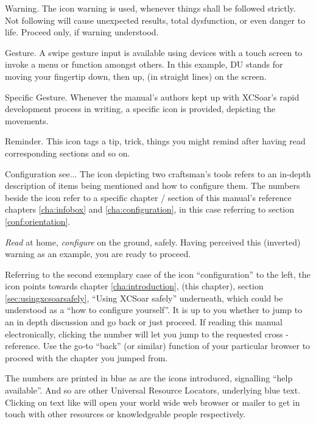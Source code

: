\warning Warning. The icon warning is used, whenever things shall be followed 
strictly.  Not following will cause unexpected results, total dysfunction, or
even danger to life. Proceed only, if warning understood.

 Gesture. A swipe gesture input is available using devices with a 
touch screen to invoke a menu or function amongst others. In this example, DU 
stands for moving your fingertip down, then up, (in straight lines) on the 
screen.
  
 Specific Gesture. Whenever the manual's authors kept up with XCSoar's rapid development process
in writing, a specific icon is provided, depicting the movements.

\tip Reminder. This icon tags a tip, trick, things you might remind after having read corresponding sections and so on.

 Configuration see... The icon depicting two craftsman's
tools refers to an in-depth description of items being mentioned and how to 
configure them. The numbers beside the icon refer to a specific chapter / 
section of this manual's reference chapters \ref{cha:infobox} and 
\ref{cha:configuration}, in this case referring to section 
\ref{conf:orientation}. 


\emph{Read} at home, \emph{configure} on the ground, safely. Having perceived 
this (inverted) warning as an example, you are ready to proceed.

 Referring to the second exemplary case of the icon 
``configuration'' to the left, the icon points
towards chapter \ref{cha:introduction}, (this chapter), section 
\ref{sec:usingxcsoarsafely}, ``Using XCSoar safely'' underneath, which could be
understood as a ``how to configure yourself''. It is up to you whether to jump
to an in depth discussion and go back or just proceed. If reading this manual 
electronically, clicking the number will let you jump to the requested cross
-reference.  Use the go-to ``back'' (or similar) function of your particular
browser to proceed with the chapter you jumped from.

The numbers are printed in blue as are the icons introduced, signalling ``help
available''. And so are other Universal Resource Locators, underlying blue
text. Clicking on text like  will open your world wide 
web browser or mailer to get in touch with other resources or knowledgeable
people respectively.

